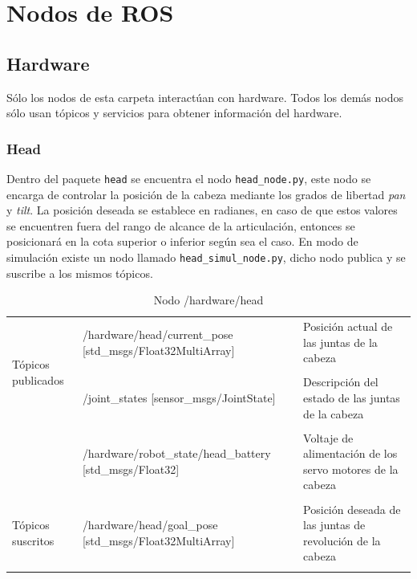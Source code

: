 \documentclass[user_manual.tex]{subfiles}
\begin{document}
 \chapter{Nodos de ROS}
 
\section{Hardware}
Sólo los nodos de esta carpeta interactúan con hardware. Todos los demás nodos sólo usan tópicos y servicios para obtener información del hardware.

\subsection{Head}

Dentro del paquete \texttt{head} se encuentra el nodo \texttt{head\_node.py}, este nodo se encarga de controlar la posición de la cabeza mediante los grados de libertad \textit{pan} y \textit{tilt}. La posición deseada se establece en radianes, en caso de que estos valores se encuentren fuera del rango de alcance de la articulación, entonces  se posicionará en la cota superior o inferior según sea el caso. En modo de simulación existe un nodo llamado \texttt{head\_simul\_node.py}, dicho nodo publica y se suscribe a los mismos tópicos.

\begin{table}[H]
\begin{center}
\begin{tabular}{|l|p{7cm}|p{4.5cm}|}%
\hline

\multirow{4}{*}{Tópicos publicados} 
&  /hardware/head/current\_pose [std\_msgs/Float32MultiArray]  & Posición actual de las juntas de la cabeza \\
& & \\
& /joint\_states [sensor\_msgs/JointState] & Descripción del estado de las juntas de la cabeza \\
& & \\
& /hardware/robot\_state/head\_battery [std\_msgs/Float32]  & Voltaje de alimentación de los servo motores de la cabeza\\ 
& & \\
\cline{1-3}

Tópicos suscritos &  /hardware/head/goal\_pose [std\_msgs/Float32MultiArray] & Posición deseada de las juntas de revolución de la cabeza \\ 
& & \\
\hline

\end{tabular}
\caption{Nodo /hardware/head}
\label{head node}
\end{center}
\end{table}
\end{document}

